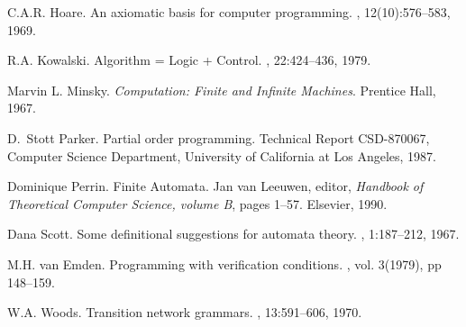 \documentclass[preprint,11pt]{elsarticle}
\begin{document}
\begin{thebibliography}{10}
C.A.R. Hoare.
\newblock An axiomatic basis for computer programming.
, 12(10):576--583, 1969.

R.A. Kowalski.
\newblock Algorithm = Logic + Control. 
, 22:424--436, 1979.



Marvin L. Minsky.
\newblock \emph{Computation: Finite and Infinite Machines}.
\newblock Prentice Hall, 1967.

D.~Stott Parker.
\newblock Partial order programming.
\newblock Technical Report CSD-870067, Computer Science Department,
  University of California at Los Angeles, 1987.

Dominique Perrin.
\newblock Finite Automata.
\newblock Jan van Leeuwen, editor,
{\em Handbook of Theoretical Computer Science, volume B}, pages 1--57.
  Elsevier, 1990.

Dana Scott.
\newblock Some definitional suggestions for automata theory.
,
1:187--212, 1967.

M.H. van Emden.
\newblock Programming with verification conditions.
,
vol. 3(1979), pp 148--159.

W.A. Woods.
\newblock Transition network grammars.
, 13:591--606, 1970.

\end{thebibliography}
\end{document}
